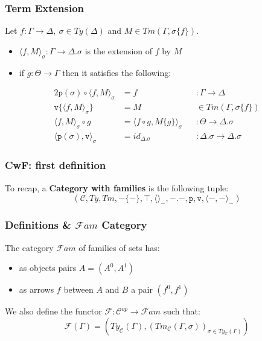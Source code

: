 \documentclass[aspectratio=169]{beamer}
\newcommand{\Fami}{\mathcal{F}am}
\newcommand{\cate}{\mathcal{C}}
\newcommand{\types}{Ty_{\cate}}
\newcommand{\terms}{Tm_{\cate}}
\newcommand{\pp}{\texttt{p}}
\newcommand{\vv}{\texttt{v}}
\newcommand{\textension}{\langle f,M\rangle_\sigma}
\begin{document}
    \begin{frame}
        \frametitle{Term Extension}
        \vspace{15pt}
        Let $f:\Gamma\to\Delta,\ \sigma\in Ty(\Delta)$ and $M\in Tm(\Gamma,\sigma\{f\})$.
        \begin{itemize} 
            \item $\textension:\Gamma\to\Delta.\sigma$ is the extension of $f$ by $M$
            \item if $g:\Theta\to\Gamma$ then it satisfies the following:
        \end{itemize}
        \vspace{5pt}
        \begin{alignat*}{2}
            \pp(\sigma)\circ\textension &= f &&: \Gamma \to \Delta\\
            \vv\{\textension\} &= M &&\in Tm(\Gamma,\sigma\{f\})\\
            \textension\circ g &= \langle f \circ g,M\{g\}\rangle_\sigma &&: \Theta \to\Delta.\sigma\\
            \langle\pp(\sigma),\vv\rangle_\sigma &= id_{\Delta.\sigma}&&:\Delta.\sigma\to\Delta.\sigma
        \end{alignat*}
    \end{frame}

    \begin{frame}
        \frametitle{CwF: first definition}
        To recap, a \textbf{Category with families} is the following tuple:
        $$(\cate, Ty, Tm, -\{-\}, \top, \langle\rangle_{-}, -.-,\pp,\vv,\langle -,-\rangle_{-})$$
    \end{frame}

    \begin{frame}
        \frametitle{Definitions \& $\Fami$ Category}
        
        The category $\Fami$ of families of sets has:
        \begin{itemize}
            \item as objects pairs $A = (A^0,A^1)$
            \item as arrows $f$ between $A$ and $B$ a pair $(f^0,f^1)$
        \end{itemize}
        \vspace{10pt}
        We also define the functor $\mathcal{F}:\cate^{op}\to\Fami$ such that:
        $$\mathcal{F}(\Gamma)=(\types(\Gamma),(\terms(\Gamma,\sigma))_{\sigma\in\types(\Gamma)})$$
    \end{frame}
\end{document}
